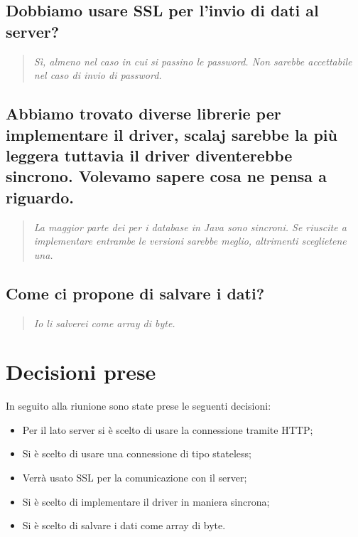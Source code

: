 \documentclass{scalatekids-article}
\begin{document}
\subsection{Dobbiamo usare SSL per l'invio di dati al server?}
\begin{quote}
  \textit{Sì, almeno nel caso in cui si passino le password. Non sarebbe accettabile nel caso di invio di password.\\}
\end{quote}
\subsection{Abbiamo trovato diverse librerie per implementare il driver, scalaj sarebbe la più leggera tuttavia il driver diventerebbe sincrono. Volevamo sapere cosa ne pensa a riguardo.}
\begin{quote}
  \textit{La maggior parte dei  per i database in Java sono sincroni. Se riuscite a implementare entrambe le versioni sarebbe meglio, altrimenti sceglietene una.\\}
\end{quote}
\subsection{Come ci propone di salvare i dati?}
\begin{quote}
  \textit{Io li salverei come array di byte.\\}
\end{quote}
\section{Decisioni prese}
In seguito alla riunione sono state prese le seguenti decisioni:
\begin{itemize}
\item Per il lato server si è scelto di usare la connessione tramite HTTP;
\item Si è scelto di usare una connessione di tipo stateless;
\item Verrà usato SSL per la comunicazione con il server;
\item Si è scelto di implementare il driver in maniera sincrona;
\item Si è scelto di salvare i dati come array di byte.
\end{itemize}
\end{document}
